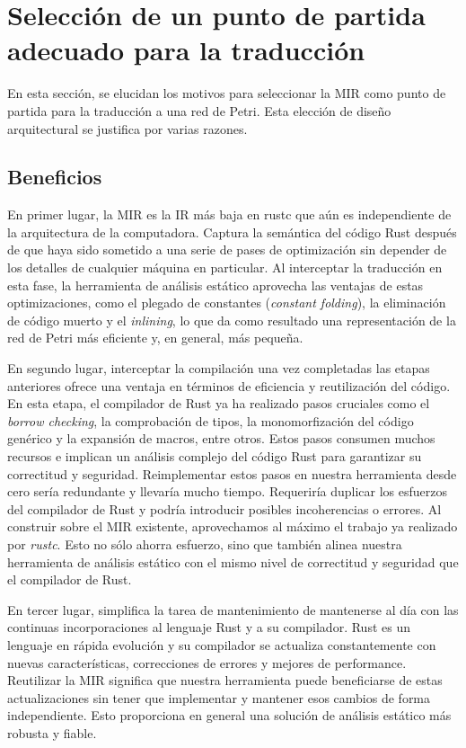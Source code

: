 \section{Selección de un punto de partida adecuado para la traducción}
\label{sec:interception-strategy}

En esta sección, se elucidan los motivos para seleccionar la \acrfull{MIR}
como punto de partida para la traducción a una red de Petri. Esta elección
de diseño arquitectural se justifica por varias razones.

\subsection{Beneficios}

En primer lugar, la \acrshort{MIR} es la \acrshort{IR} más baja en rustc
que aún es independiente de la arquitectura de la computadora.
Captura la semántica del código Rust después de que haya sido sometido a una serie de pases
de optimización sin depender de los detalles de cualquier máquina en particular.
Al interceptar la traducción en esta fase, la herramienta de
análisis estático aprovecha las ventajas de estas optimizaciones,
como el plegado de constantes (\textit{constant folding}),
la eliminación de código muerto y el \textit{inlining}, lo que da como resultado una representación de
la red de Petri más eficiente y, en general, más pequeña.

En segundo lugar, interceptar la compilación una vez completadas las etapas anteriores ofrece
una ventaja en términos de eficiencia y reutilización del código. En esta etapa, el compilador de
Rust ya ha realizado pasos cruciales como el \emph{borrow checking}, la comprobación de
tipos, la monomorfización del código genérico y la expansión de macros, entre otros. Estos
pasos consumen muchos recursos e implican un análisis complejo del código Rust para
garantizar su correctitud y seguridad. Reimplementar estos pasos en nuestra herramienta desde
cero sería redundante y llevaría mucho tiempo. Requeriría duplicar los esfuerzos del
compilador de Rust y podría introducir posibles incoherencias o errores. Al construir sobre el
\acrshort{MIR} existente, aprovechamos al máximo el trabajo ya realizado por \emph{rustc}.
Esto no sólo ahorra esfuerzo,
sino que también alinea nuestra herramienta de análisis estático con el mismo nivel de
correctitud y seguridad que el compilador de Rust.

En tercer lugar, simplifica la tarea de mantenimiento de mantenerse al día con las continuas
incorporaciones al lenguaje Rust y a su compilador. Rust es un lenguaje en rápida evolución y
su compilador se actualiza constantemente con nuevas características, correcciones de errores y
mejores de performance. Reutilizar la \acrshort{MIR} significa que nuestra herramienta puede
beneficiarse de estas actualizaciones sin tener que implementar y mantener esos cambios de
forma independiente. Esto proporciona en general una solución de análisis estático más robusta
y fiable.


